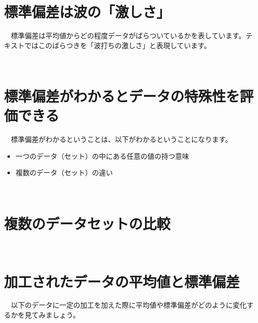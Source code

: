 \documentclass[
  12pt,
]{book}
\providecommand{\tightlist}{%
  \setlength{\itemsep}{0pt}\setlength{\parskip}{0pt}}
\begin{document}
\hypertarget{ux6a19ux6e96ux504fux5deeux306fux6ce2ux306eux6fc0ux3057ux3055}{%
\section{標準偏差は波の「激しさ」}\label{ux6a19ux6e96ux504fux5deeux306fux6ce2ux306eux6fc0ux3057ux3055}}

　標準偏差は平均値からどの程度データがばらついているかを表しています。テキストではこのばらつきを「波打ちの激しさ」と表現しています。

　

\hypertarget{ux6a19ux6e96ux504fux5deeux304cux308fux304bux308bux3068ux30c7ux30fcux30bfux306eux7279ux6b8aux6027ux3092ux8a55ux4fa1ux3067ux304dux308b}{%
\section{標準偏差がわかるとデータの特殊性を評価できる}\label{ux6a19ux6e96ux504fux5deeux304cux308fux304bux308bux3068ux30c7ux30fcux30bfux306eux7279ux6b8aux6027ux3092ux8a55ux4fa1ux3067ux304dux308b}}

　標準偏差がわかるということは、以下がわかるということになります。

\begin{itemize}
\tightlist
\item
  一つのデータ（セット）の中にある任意の値の持つ意味
\item
  複数のデータ（セット）の違い
\end{itemize}

　

\hypertarget{ux8907ux6570ux306eux30c7ux30fcux30bfux30bbux30c3ux30c8ux306eux6bd4ux8f03}{%
\section{複数のデータセットの比較}\label{ux8907ux6570ux306eux30c7ux30fcux30bfux30bbux30c3ux30c8ux306eux6bd4ux8f03}}

　

\hypertarget{ux52a0ux5de5ux3055ux308cux305fux30c7ux30fcux30bfux306eux5e73ux5747ux5024ux3068ux6a19ux6e96ux504fux5dee}{%
\section{加工されたデータの平均値と標準偏差}\label{ux52a0ux5de5ux3055ux308cux305fux30c7ux30fcux30bfux306eux5e73ux5747ux5024ux3068ux6a19ux6e96ux504fux5dee}}

　以下のデータに一定の加工を加えた際に平均値や標準偏差がどのように変化するかを見てみましょう。
\end{document}
